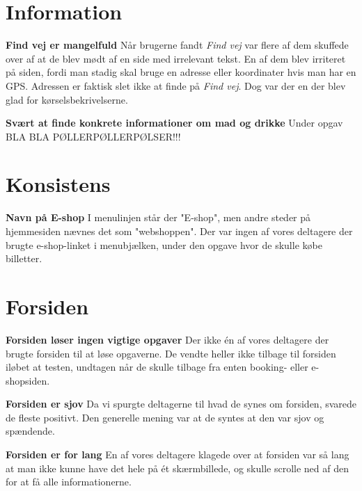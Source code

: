 \documentclass[10pt,a4paper]{article}      %
\newcommand\pic[1]{\texttt{[image: Pics/\#1]}}
\renewcommand\good{\pic{good}}
\renewcommand\smallproblem{\pic{smallproblem}}
\renewcommand\seriousproblem{\pic{seriousproblem}}
\begin{document}
\section{Information}

\begin{kommentarer}

\item[\smallproblem] \textbf{Find vej er mangelfuld}
Når brugerne fandt \emph{Find vej} var flere af dem skuffede over af at de blev mødt af en side med irrelevant tekst. En af dem blev irriteret på siden, fordi man stadig skal bruge en adresse eller koordinater hvis man har en GPS. Adressen er faktisk slet ikke at finde på \emph{Find vej}. Dog var der en der blev glad for kørselsbekrivelserne. 

\item[\smallproblem] \textbf{Svært at finde konkrete informationer om mad og drikke}
Under opgav  BLA BLA PØLLERPØLLERPØLSER!!!


\end{kommentarer}


\section{Konsistens}

\begin{kommentarer}
\item[\smallproblem] \textbf{Navn på E-shop}
I menulinjen står der "E-shop", men andre steder på hjemmesiden nævnes det som "webshoppen". Der var ingen af vores deltagere der brugte e-shop-linket i menubjælken, under den opgave hvor de skulle købe billetter.
\end{kommentarer}

\section{Forsiden}

\begin{kommentarer}
\item[\seriousproblem] \textbf{Forsiden løser ingen vigtige opgaver}
Der ikke én af vores deltagere der brugte forsiden til at løse opgaverne. De vendte heller ikke tilbage til forsiden iløbet at testen, undtagen når de skulle tilbage fra enten booking- eller e-shopsiden.

\item[\good] \textbf{Forsiden er sjov}
Da vi spurgte deltagerne til hvad de synes om forsiden, svarede de fleste positivt. Den generelle mening var at de syntes at den var sjov og spændende.

\item[\smallproblem] \textbf{Forsiden er for lang}
En af vores deltagere klagede over at forsiden var så lang at man ikke kunne have det hele på ét skærmbillede, og skulle scrolle ned af den for at få alle informationerne.
\end{kommentarer}
\end{document}
